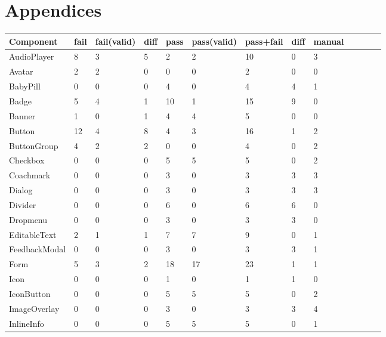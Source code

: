 \documentclass{master_thesis}
\begin{document}
\section*{Appendices}


\begin{table}[!ht]
    \centering
    \begin{tabular}{|l|l|l|l|l|l|l|l|l|l|l|l|l|}
    \hline
        Component & fail & fail(valid) & diff & pass & pass(valid) & pass+fail & diff & manual  \\ \hline
        AudioPlayer & 8 & 3 & 5 & 2 & 2 & 10 & 0 & 3  \\ \hline
        Avatar & 2 & 2 & 0 & 0 & 0 & 2 & 0 & 0  \\ \hline
        BabyPill & 0 & 0 & 0 & 4 & 0 & 4 & 4 & 1  \\ \hline
        Badge & 5 & 4 & 1 & 10 & 1 & 15 & 9 & 0  \\ \hline
        Banner & 1 & 0 & 1 & 4 & 4 & 5 & 0 & 0  \\ \hline
        Button & 12 & 4 & 8 & 4 & 3 & 16 & 1 & 2  \\ \hline
        ButtonGroup & 4 & 2 & 2 & 0 & 0 & 4 & 0 & 2  \\ \hline
        Checkbox & 0 & 0 & 0 & 5 & 5 & 5 & 0 & 2  \\ \hline
        Coachmark & 0 & 0 & 0 & 3 & 0 & 3 & 3 & 3  \\ \hline
        Dialog & 0 & 0 & 0 & 3 & 0 & 3 & 3 & 3  \\ \hline
        Divider & 0 & 0 & 0 & 6 & 0 & 6 & 6 & 0  \\ \hline
        Dropmenu & 0 & 0 & 0 & 3 & 0 & 3 & 3 & 0  \\ \hline
        EditableText & 2 & 1 & 1 & 7 & 7 & 9 & 0 & 1  \\ \hline
        FeedbackModal & 0 & 0 & 0 & 3 & 0 & 3 & 3 & 1  \\ \hline
        Form & 5 & 3 & 2 & 18 & 17 & 23 & 1 & 1  \\ \hline
        Icon & 0 & 0 & 0 & 1 & 0 & 1 & 1 & 0  \\ \hline
        IconButton & 0 & 0 & 0 & 5 & 5 & 5 & 0 & 2  \\ \hline
        ImageOverlay & 0 & 0 & 0 & 3 & 0 & 3 & 3 & 4  \\ \hline
        InlineInfo & 0 & 0 & 0 & 5 & 5 & 5 & 0 & 1  \\ \hline
    \end{tabular}
\end{table}
\end{document}
